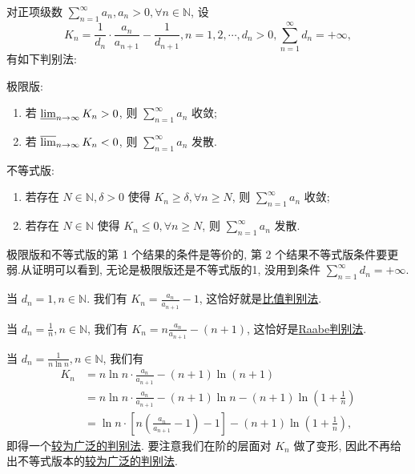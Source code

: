 \documentclass[../../main.tex]{subfiles}%
\begin{document}
\begin{theorem}[Kummer链]\label{theorem:Kummer链}
对正项级数 \( \sum_{n=1}^\infty a_n, a_n > 0, \forall n \in \mathbb{N} \), 设
\[
K_n = \frac{1}{d_n} \cdot \frac{a_n}{a_{n + 1}} - \frac{1}{d_{n + 1}}, n = 1, 2, \cdots, d_n > 0, \sum_{n=1}^\infty d_n = +\infty,
\]
有如下判别法:

极限版:
\begin{enumerate}
\item 若 \( \varliminf_{n \to \infty} K_n > 0 \), 则 \( \sum_{n=1}^\infty a_n \) 收敛;
\item 若 \( \varlimsup_{n \to \infty} K_n < 0 \), 则 \( \sum_{n=1}^\infty a_n \) 发散.
\end{enumerate}

不等式版:
\begin{enumerate}
\item 若存在 \( N \in \mathbb{N}, \delta > 0 \) 使得 \( K_n \geqslant \delta, \forall n \geqslant N \), 则 \( \sum_{n=1}^\infty a_n \) 收敛;

\item 若存在 \( N \in \mathbb{N} \) 使得 \( K_n \leqslant 0, \forall n \geqslant N \), 则 \( \sum_{n=1}^\infty a_n \) 发散.
\end{enumerate}
\end{theorem}
\begin{note}
极限版和不等式版的第 1 个结果的条件是等价的, 第 2 个结果不等式版条件要更弱.从证明可以看到, 无论是极限版还是不等式版的1, 没用到条件 \( \sum_{n=1}^\infty d_n = +\infty \).
\end{note}
\begin{remark}
当 \( d_n = 1, n \in \mathbb{N} \). 我们有 \( K_n = \frac{a_n}{a_{n + 1}} - 1 \), 这恰好就是\hyperref[theorem:级数-比值判别法]{比值判别法}.

当 \( d_n = \frac{1}{n}, n \in \mathbb{N} \), 我们有 \( K_n = n \frac{a_n}{a_{n + 1}} - (n + 1) \), 这恰好是\hyperref[theorem:Raabe(拉比)判别法]{Raabe判别法}.

当 \( d_n = \frac{1}{n \ln n}, n \in \mathbb{N} \), 我们有
\begin{align*}
K_n &= n \ln n \cdot \frac{a_n}{a_{n + 1}} - (n + 1) \ln (n + 1)
\\
&= n \ln n \cdot \frac{a_n}{a_{n + 1}} - (n + 1) \ln n - (n + 1) \ln \left( 1 + \frac{1}{n} \right)
\\
&= \ln n \cdot \left[ n \left( \frac{a_n}{a_{n + 1}} - 1 \right) - 1 \right] - (n + 1) \ln \left( 1 + \frac{1}{n} \right),
\end{align*}
即得一个\hyperref[theorem:较为广泛的判别法]{较为广泛的判别法}. 要注意我们在阶的层面对 \( K_n \) 做了变形, 因此不再给出不等式版本的\hyperref[theorem:较为广泛的判别法]{较为广泛的判别法}.
\end{remark}
\end{document}
